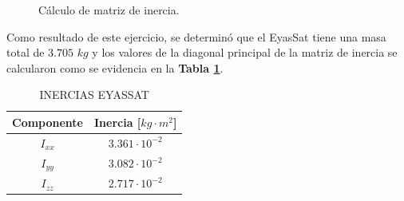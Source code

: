\begin{figure}[h]
	\centering
	
	\caption{Cálculo de matriz de inercia.}
	\label{fig:eyassat_lab}
\end{figure}

Como resultado de este ejercicio, se determinó que el EyasSat tiene una masa total de $3.705$ $kg$ y los valores de la diagonal principal de la matriz de inercia se calcularon como se evidencia en la \textbf{Tabla \ref{table:inercia_eyassat}}.
\begin{table}[h]
	\caption{\MakeUppercase{Inercias EyasSat}}
	\begin{center}
		\begin{tabular}{ c c}
			
			Componente & Inercia [$kg\cdot m^2$] \\ \hline
			$I_{xx}$ &  $3.361\cdot10^{-2}$ \\ 
			$I_{yy}$ &  $3.082\cdot10^{-2}$ \\ 
			$I_{zz}$ &  $2.717\cdot10^{-2}$ \\ \hline
	
		\end{tabular}
	\end{center}
	\label{table:inercia_eyassat}
\end{table}


